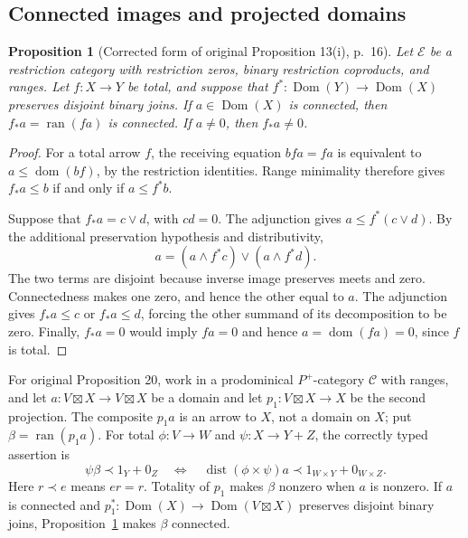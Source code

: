 \documentclass[11pt]{article}
\newtheorem{proposition}[theorem]{Proposition}
\newcommand{\C}{\mathcal C}\newcommand{\D}{\mathcal D}\newcommand{\B}{\mathcal B}
\newcommand{\dom}{\operatorname{dom}}\newcommand{\ran}{\operatorname{ran}}
\newcommand{\dist}{\operatorname{dist}}\newcommand{\ass}{\operatorname{ass}}
\begin{document}
\subsection{Connected images and projected domains}
\begin{proposition}[Corrected form of original Proposition 13(i), p.~16]\label{prop:connected-image-conditional}
Let $\mathcal E$ be a restriction category with restriction zeros, binary restriction coproducts, and ranges. Let $f:X\to Y$ be total, and suppose that $f^*:\operatorname{Dom}(Y)\to\operatorname{Dom}(X)$ preserves disjoint binary joins. If $a\in\operatorname{Dom}(X)$ is connected, then $f_*a=\ran(fa)$ is connected. If $a\ne0$, then $f_*a\ne0$.
\end{proposition}
\begin{proof}
For a total arrow $f$, the receiving equation $bfa=fa$ is equivalent to $a\leq\dom(bf)$, by the restriction identities. Range minimality therefore gives $f_*a\leq b$ if and only if $a\leq f^*b$.

Suppose that $f_*a=c\vee d$, with $cd=0$. The adjunction gives $a\leq f^*(c\vee d)$. By the additional preservation hypothesis and distributivity,
\[
a=(a\wedge f^*c)\vee(a\wedge f^*d).
\]
The two terms are disjoint because inverse image preserves meets and zero. Connectedness makes one zero, and hence the other equal to $a$. The adjunction gives $f_*a\leq c$ or $f_*a\leq d$, forcing the other summand of its decomposition to be zero. Finally, $f_*a=0$ would imply $fa=0$ and hence $a=\dom(fa)=0$, since $f$ is total.
\end{proof}

For original Proposition 20, work in a prodominical $P^+$-category $\C$ with ranges, and let $a:V\boxtimes X\to V\boxtimes X$ be a domain and let $p_1:V\boxtimes X\to X$ be the second projection. The composite $p_1a$ is an arrow to $X$, not a domain on $X$; put $\beta=\ran(p_1a)$. For total $\phi:V\to W$ and $\psi:X\to Y+Z$, the correctly typed assertion is
\[
\psi\beta\prec 1_Y+0_Z
\quad\Longleftrightarrow\quad
\dist(\phi\times\psi)a\prec1_{W\times Y}+0_{W\times Z}.
\]
Here $r\prec e$ means $er=r$. Totality of $p_1$ makes $\beta$ nonzero when $a$ is nonzero. If $a$ is connected and $p_1^*:\operatorname{Dom}(X)\to\operatorname{Dom}(V\boxtimes X)$ preserves disjoint binary joins, Proposition~\ref{prop:connected-image-conditional} makes $\beta$ connected.
\end{document}
